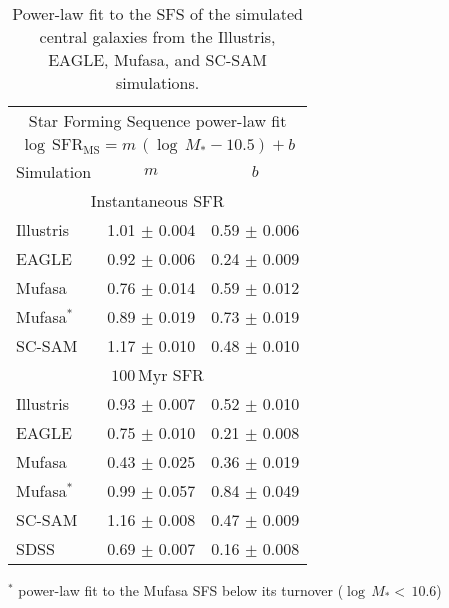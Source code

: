 \documentclass[tighten, preprint]{aastex62}
\begin{document}
\begin{table}
\caption{Power-law fit to the SFS of the simulated central galaxies from the
Illustris, EAGLE, {\sc Mufasa}, and SC-SAM simulations.} 
\begin{center}
\begin{tabular}{p{3cm}cc} \toprule
\multicolumn{3}{c}{Star Forming Sequence power-law fit} \\ [3pt]
\multicolumn{3}{c}{$\log\,\mathrm{SFR}_\mathrm{MS} = m\,(\log\,M_* - 10.5) + b$  } \\ [3pt]
Simulation & $m$ & $b$ \\ 
\hline
\multicolumn{3}{c}{Instantaneous SFR} \\
Illustris 			& 1.01 $\pm$ 0.004 & 0.59 $\pm$ 0.006 \\ 
EAGLE 				& 0.92 $\pm$ 0.006 & 0.24 $\pm$ 0.009 \\ 
{\sc Mufasa} 		& 0.76 $\pm$ 0.014 & 0.59 $\pm$ 0.012 \\ 
{\sc Mufasa}$^*$ 	& 0.89 $\pm$ 0.019 & 0.73 $\pm$ 0.019 \\ 
SC-SAM 				& 1.17 $\pm$ 0.010 & 0.48 $\pm$ 0.010 \\ 
\hline \hline
\multicolumn{3}{c}{$100\,\mathrm{Myr}$ SFR} \\
Illustris 			& 0.93 $\pm$ 0.007 & 0.52 $\pm$ 0.010 \\
EAGLE  				& 0.75 $\pm$ 0.010 & 0.21 $\pm$ 0.008 \\
{\sc Mufasa}		& 0.43 $\pm$ 0.025 & 0.36 $\pm$ 0.019 \\
{\sc Mufasa}$^*$ 	& 0.99 $\pm$ 0.057 & 0.84 $\pm$ 0.049 \\ 
SC-SAM 				& 1.16 $\pm$ 0.008 & 0.47 $\pm$ 0.009 \\ 
\hline
\hline \hspace{10pt}
SDSS 				& 0.69 $\pm$ 0.007 & 0.16 $\pm$ 0.008 \\ 
\hline
\end{tabular} \label{tab:sfms_powerlaw}
\end{center}
$^*$ power-law fit to the {\sc Mufasa} SFS below its turnover ($\log\,M_* {<}\,10.6$)
\end{table}
\end{document}
